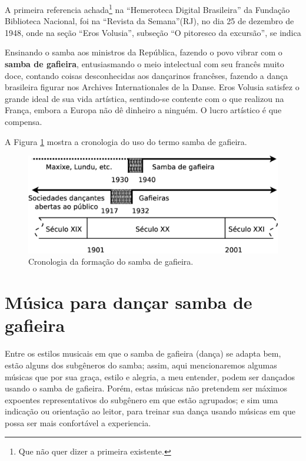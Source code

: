 A primeira referencia achada\footnote{Que não quer dizer a primeira existente.} 
na ``Hemeroteca Digital Brasileira'' da Fundação Biblioteca Nacional,
foi na ``Revista da Semana''(RJ), no dia 25 de dezembro de 1948,
onde na seção ``Eros Volusia'', subseção ``O pitoresco da excursão'', se indica \cite[pp. 48]{sambagafieirarefbn}
\begin{citando}
Ensinando o samba aos ministros da República, 
fazendo o povo vibrar com o \textbf{samba de gafieira}, entusiasmando
o meio intelectual com seu francês muito doce,
contando coisas desconhecidas aos dançarinos francêses,
fazendo a dança brasileira figurar nos Archives Internationales de la Danse.
Eros Volusia satisfez o grande ideal de sua vida artística, sentindo-se contente
com o que realizou na França, embora a Europa não dê dinheiro a ninguém.
O lucro artístico é que compensa.
\end{citando}


A Figura \ref{fig:sambagafieiracrono} mostra a cronologia do uso do termo samba de gafieira. 

\begin{figure}[h]
  \centering
    \includegraphics[width=1.0\textwidth]{chapters/cap-historia-sambagafieira/gafieira-crono.eps}
  \caption{ Cronologia da formação do samba de gafieira.}
\label{fig:sambagafieiracrono}
\end{figure}

\section{Música para dançar samba de gafieira}
\label{subsec:gafieiradancaestilos}

Entre os estilos musicais em que o samba de gafieira (dança) se adapta bem, 
estão alguns dos subgêneros do samba; assim,
aqui mencionaremos algumas músicas que por sua graça, estilo e alegria,
a meu entender, podem ser dançados usando o samba de gafieira. Porém, 
estas músicas não pretendem ser máximos expoentes representativos do subgênero em que estão agrupados;
e sim uma indicação ou orientação ao leitor, 
para treinar sua dança usando músicas em que possa ser mais confortável a experiencia.

